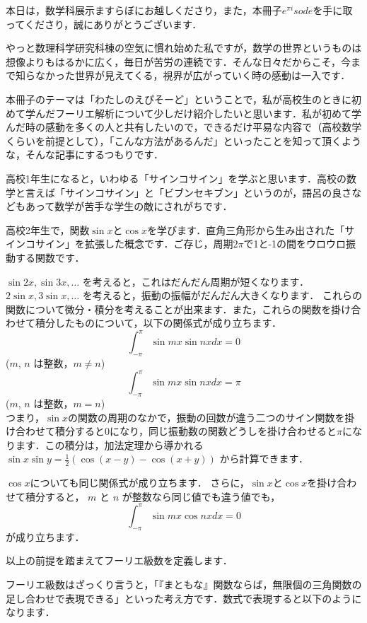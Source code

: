 本日は，数学科展示ますらぼにお越しくださり，また，本冊子$e^{\pi i}sode$を手に取ってくださり，誠にありがとうございます．

やっと数理科学研究科棟の空気に慣れ始めた私ですが，数学の世界というものは想像よりもはるかに広く，毎日が苦労の連続です．そんな日々だからこそ，今まで知らなかった世界が見えてくる，視界が広がっていく時の感動は一入です．

本冊子のテーマは「わたしのえぴそーど」ということで，私が高校生のときに初めて学んだフーリエ解析について少しだけ紹介したいと思います．私が初めて学んだ時の感動を多くの人と共有したいので，できるだけ平易な内容で（高校数学くらいを前提として），「こんな方法があるんだ」といったことを知って頂くような，そんな記事にするつもりです．

高校1年生になると，いわゆる「サインコサイン」を学ぶと思います．高校の数学と言えば「サインコサイン」と「ビブンセキブン」というのが，語呂の良さなどもあって数学が苦手な学生の敵にされがちです．

高校2年生で，関数$\sin x$と$\cos x$を学びます．直角三角形から生み出された「サインコサイン」を拡張した概念です．ご存じ，周期$2 \pi$で1と-1の間をウロウロ振動する関数です．

$\sin 2x,\sin 3x,\dotsc$ を考えると，これはだんだん周期が短くなります． $2\sin x,3\sin x,\dotsc$ を考えると，振動の振幅がだんだん大きくなります．
これらの関数について微分・積分を考えることが出来ます．また，これらの関数を掛け合わせて積分したものについて，以下の関係式が成り立ちます．
\[
\int_{-\pi}^\pi \sin mx \sin nx dx = 0
\]
($m$, $n$ は整数，$m \neq n$)
\[
  \int_{-\pi}^\pi \sin mx \sin nx dx = \pi
\]
($m$, $n$ は整数，$m = n$)\\


つまり，$\sin x$の関数の周期のなかで，振動の回数が違う二つのサイン関数を掛け合わせて積分すると0になり，同じ振動数の関数どうしを掛け合わせると$\pi$になります．この積分は，加法定理から導かれる
$\sin x \sin y = \frac{1}{2} (\cos(x-y)-\cos(x+y))$
から計算できます．

$\cos x$についても同じ関係式が成り立ちます．
さらに，$\sin x$と$\cos x$を掛け合わせて積分すると， $m$ と $n$ が整数なら同じ値でも違う値でも，
\[
  \int_{-\pi}^\pi \sin mx \cos nx dx = 0
\]
が成り立ちます．

以上の前提を踏まえてフーリエ級数を定義します．

フーリエ級数はざっくり言うと，「『まともな』関数ならば，無限個の三角関数の足し合わせで表現できる」といった考え方です．数式で表現すると以下のようになります．

